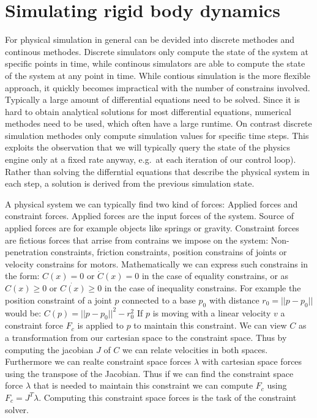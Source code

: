 \documentclass[english,ngerman]{KITreprt}
\begin{document}
\section{Simulating rigid body
dynamics}\label{section:rigid-body-simulation}

For physical simulation in general can be devided into discrete methodes
and continous methodes. Discrete simulators only compute the state of
the system at specific points in time, while continous simulators are
able to compute the state of the system at any point in time. While
contious simulation is the more flexible approach, it quickly becomes
impractical with the number of constrains involved. Typically a large
amount of differential equations need to be solved. Since it is hard to
obtain analytical solutions for most differential equations, numerical
methodes need to be used, which often have a large runtime. On contrast
discrete simulation methodes only compute simulation values for specific
time steps. This exploits the observation that we will typically query
the state of the physics engine only at a fixed rate anyway, e.g.~at
each iteration of our control loop). Rather than solving the differntial
equations that describe the physical system in each step, a solution is
derived from the previous simulation state.

A physical system we can typically find two kind of forces: Applied
forces and constraint forces. Applied forces are the input forces of the
system. Source of applied forces are for example objects like springs or
gravity. Constraint forces are fictious forces that arrise from
contrains we impose on the system: Non-penetration constraints, friction
constraints, position constrains of joints or velocity constrains for
motors. Mathematically we can express such constrains in the form:
$C(x) = 0$ or $\dot{C}(x) = 0$ in the case of equality constrains, or as
$C(x) \geq 0$ or $\dot{C(x)} \geq 0$ in the case of inequality
constrains. For example the position constraint of a joint $p$ connected
to a base $p_0$ with distance $r_0 = ||p-p_0||$ would be:
$C(p) = || p - p_0 ||^2 - r_0^2$ If $p$ is moving with a linear velocity
$v$ a constraint force $F_c$ is applied to $p$ to maintain this
constraint. We can view $C$ as a transformation from our cartesian space
to the constraint space. Thus by computing the jacobian $J$ of $C$ we
can relate velocities in both spaces. Furthermore we can realte
constraint space forces $\lambda$ with cartesian space forces using the
transpose of the Jacobian. Thus if we can find the constraint space
force $\lambda$ that is needed to maintain this constraint we can
compute $F_c$ using $F_c = J^T \lambda$. Computing this constraint space
forces is the task of the constraint solver.
\end{document}
